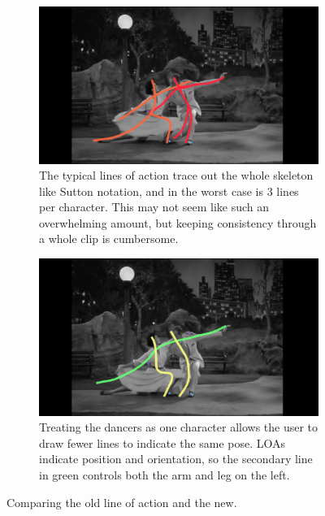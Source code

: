 \begin{figure}[H]
	\centering
        \begin{subfigure}[b!]{0.45\textwidth}
        	\centering
                \includegraphics[width=\linewidth]{img/keyframe_case_7_baseline}
                \caption{The typical lines of action trace out the whole skeleton like Sutton notation, and in the worst case is 3 lines per character. This may not seem like such an overwhelming amount, but keeping consistency through a whole clip is cumbersome.}
                \label{fig:baseline}
        \end{subfigure}
        \quad
        \begin{subfigure}[b!]{0.45\textwidth}
        	\centering
                \includegraphics[width=\linewidth]{img/keyframe_case_7_new}
                \caption{Treating the dancers as one character allows the user to draw fewer lines to indicate the same pose. LOAs indicate position and orientation, so the secondary line in green controls both the arm and leg on the left.}
                \label{fig:new_notation}
        \end{subfigure}%
        \caption{Comparing the old line of action and the new.}
	\label{fig:poses}
\end{figure}


